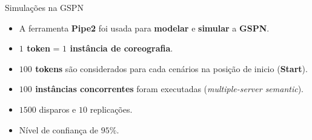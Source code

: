 \documentclass[xcolor=svgnames]{beamer}
\begin{document}
   \begin{frame}{ Simulações na GSPN }
      \begin{itemize}
	\item <1-> A ferramenta \textbf{Pipe2} foi usada para \textbf{modelar} e \textbf{simular} a \textbf{GSPN}.
	\item <2-> \textbf{$1$ token} = \textbf{$1$ instância de coreografia}.
	\item <2-> \textbf{$100$ tokens} são considerados para cada cenários na posição de inicio (\textbf{Start}).
	\item <2-> \textbf{$100$ instâncias concorrentes} foram executadas (\textit{multiple-server semantic}).
	\item <3-> $1500$ disparos e $10$ replicações.
	\item <3-> Nível de confiança de $95\%$.
      \end{itemize}
    \end{frame}
\end{document}
